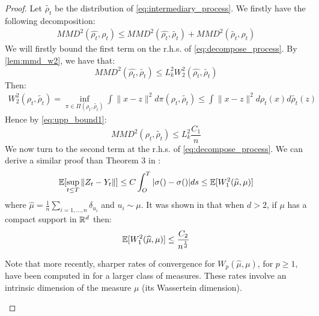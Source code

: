 \begin{proof}
		
	\vspace{2cm}
	Let $\widetilde{\rho_t}$ be the distribution of \eqref{eq:intermediary_process}. We firstly have the following decomposition:
	\begin{align}\label{eq:decompose_process}
	MMD^2(\widehat{\rho_t}, \rho_t) \le MMD^2(\widehat{\rho_t}, \widetilde{\rho_t})+ MMD^2(\widetilde{\rho_t}, \rho_t)
	\end{align}
	 We will firstly bound the first term on the r.h.s. of \eqref{eq:decompose_process}. By \cref{lem:mmd_w2}, we have that:
	 \begin{equation}
	 MMD^2(\widehat{\rho_t}, \widetilde{\rho_t})\le L_k^2 W_2^2(\widehat{\rho_t}, \widetilde{\rho_t})
	 \end{equation}
	 Then:
	 \begin{align}
	 W_2^2(\rho_t, \widetilde{\rho_t}) = \inf_{\pi \in \Pi(\rho_t, \widetilde{\rho_t})} \int \| x-z \|^2 d\pi(\rho_t, \widetilde{\rho_t}) \le \int \|x-z\|^2 d\rho_t(x)d\widetilde{\rho_t}(z)
	 \end{align}
	 Hence by \eqref{eq:upp_bound1}:
	 \begin{equation}
	 MMD^2(\rho_t, \widetilde{\rho_t})\le L_k^2 \frac{C_1}{n}
	 \end{equation}
	We now turn to the second term at the r.h.s. of \eqref{eq:decompose_process}. We can derive a similar proof than Theorem 3 in \cite{jourdain2007nonlinear}:
	 \begin{align}
	 {{\mathbb E}}[\sup_{t\le T}\|Z_t-Y_t\|] \le   C \int_{O}^T |\sigma() -\sigma()| ds \le {{\mathbb E}}[W_1^2(\widehat{\mu},\mu)]
	 \end{align}
	where $\widehat{\mu}=\frac{1}{n}\sum_{i=1, \dots,n}\delta_{u_i}$ and $u_i \sim \mu$. It was shown in \cite{dudley1969speed} that when $d > 2$, if $\mu$ has a compact support in ${{\mathbb R}}^d$ then:
	\begin{equation}
		{{\mathbb E}}[W_1^2(\widehat{\mu},\mu)]\le \frac{C_2}{n^{\frac{1}{d}}}
	\end{equation}
	\begin{remark}
	Note that more recently, sharper rates of convergence  for $W_p(\widehat{ \mu}, \mu)$, for $p\ge 1$, have been computed in \cite{weed2017sharp} for a larger class of measures. These rates involve an intrinsic dimension of the measure $\mu$ (its Wassertein dimension). 
	\end{remark}
\end{proof}

